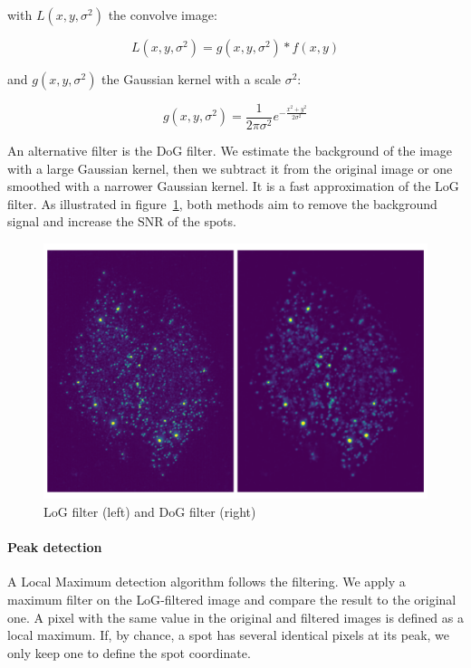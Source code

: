 \noindent
with $L(x, y, \sigma^2)$ the convolve image:

\begin{equation}
	L(x, y, \sigma^2) = g(x, y, \sigma^2) * f(x, y)
\end{equation}

\noindent
and $g(x, y, \sigma^2)$ the Gaussian kernel with a scale $\sigma^2$:

\begin{equation}
	g(x, y, \sigma^2) = \frac{1}{2\pi \sigma^2} e^{-{\frac{x^{2} + y^{2}}{2\sigma^2}}}
\end{equation}

An alternative filter is the \ac{DoG} filter.
We estimate the background of the image with a large Gaussian kernel, then we subtract it from the original image or one smoothed with a narrower Gaussian kernel.
It is a fast approximation of the \ac{LoG} filter.
As illustrated in figure~\ref{fig:filters_detection}, both methods aim to remove the background signal and increase the \ac{SNR} of the spots.


\begin{figure}[h]
    \centering
    \includegraphics[width=1\textwidth]{figures/chapter2/filter_background}
    \caption{\ac{LoG} filter (left) and \ac{DoG} filter (right)}
    \label{fig:filters_detection}
\end{figure}

\paragraph{Peak detection}

A Local Maximum detection algorithm follows the filtering.
We apply a maximum filter on the \ac{LoG}-filtered image and compare the result to the original one.
A pixel with the same value in the original and filtered images is defined as a local maximum.
If, by chance, a spot has several identical pixels at its peak, we only keep one to define the spot coordinate.

